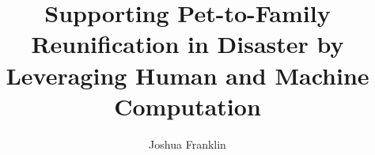\documentclass[modernstyle,11pt]{thesis}
\title{Supporting Pet-to-Family Reunification in Disaster by Leveraging Human and Machine Computation}
\author{Joshua Franklin}{Barron}
\begin{document}







\nocite{*}		%

%
%
\end{document}
